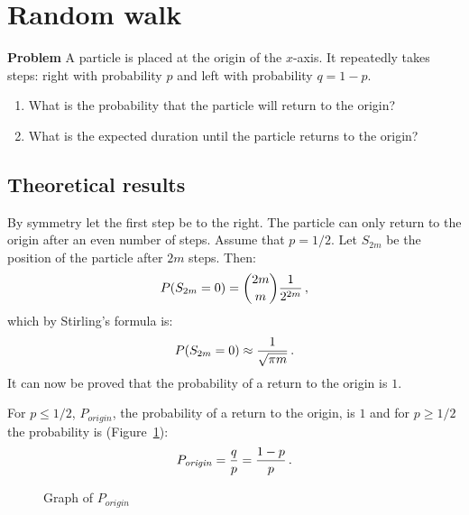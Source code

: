 
\section{Random walk}\label{s.walk}

\textbf{Problem} A particle is placed at the origin of the $x$-axis. It repeatedly takes steps: right with probability $p$ and left with probability $q=1-p$.
\begin{enumerate}
\item What is the probability that the particle will return to the origin?
\item What is the expected duration until the particle returns to the origin?
\end{enumerate}
\begin{center}
\end{center}

\subsection{Theoretical results}

By symmetry let the first step be to the right. The particle can only return to the origin after an even number of steps. Assume that $p=1/2$. Let $S_{2m}$ be the position of the particle after $2m$ steps. Then:
\[
P(S_{2m}=0) = \displaystyle{2m \choose m}\displaystyle\frac{1}{2^{2m}}\,,
\]
which by Stirling's formula is:
\[
P(S_{2m}=0) \approx \displaystyle\frac{1}{\sqrt{\pi m}}\,.
\]
It can now be proved that the probability of a return to the origin is $1$.

For $p\leq 1/2$, $P_{\mathit{origin}}$, the probability of a return to the origin, is $1$ and for $p\geq 1/2$ the probability is (Figure~\ref{f.walk1}):
\[
P_{\mathit{origin}} = \displaystyle\frac{q}{p}=\displaystyle\frac{1-p}{p}\,.
\]
\begin{figure}
\begin{center}
\caption{Graph of $P_{\mathit{origin}}$}\label{f.walk1}
\end{center}
\end{figure}


